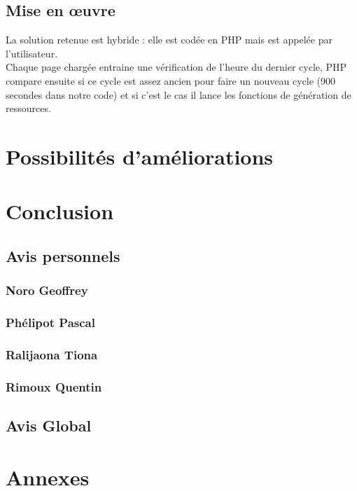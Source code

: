 \documentclass[11pt,a4paper]{article}
\begin{document}
\subsection{Mise en œuvre}
La solution retenue est hybride : elle est codée en PHP mais est appelée par l'utilisateur. \\
Chaque page chargée entraine une vérification de l'heure du dernier cycle, PHP compare ensuite si ce cycle est assez ancien pour faire un nouveau cycle (900 secondes dans notre code) et si c'est le cas il lance les fonctions de génération de ressources.

\newpage\section{Possibilités d'améliorations}

\newpage\section{Conclusion}
\subsection{Avis personnels}
\subsubsection{Noro Geoffrey}
\subsubsection{Phélipot Pascal}
\subsubsection{Ralijaona Tiona}
\subsubsection{Rimoux Quentin}
\subsection{Avis Global}

\newpage{}
\section{Annexes}
\end{document}
